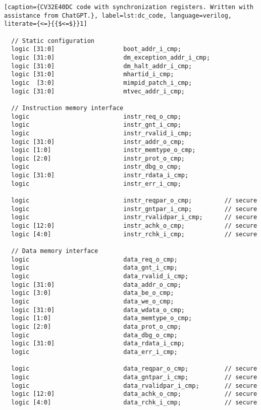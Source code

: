 \begin{lstlisting}[caption={CV32E40DC code with synchronization registers. Written with assistance from ChatGPT.}, label=lst:dc_code, language=verilog, literate={<=}{{$<=$}}1]                                                                                    

  // Static configuration
  logic [31:0]                   boot_addr_i_cmp;
  logic [31:0]                   dm_exception_addr_i_cmp;
  logic [31:0]                   dm_halt_addr_i_cmp;
  logic [31:0]                   mhartid_i_cmp;
  logic  [3:0]                   mimpid_patch_i_cmp;
  logic [31:0]                   mtvec_addr_i_cmp;

  // Instruction memory interface
  logic                          instr_req_o_cmp;
  logic                          instr_gnt_i_cmp;
  logic                          instr_rvalid_i_cmp;
  logic [31:0]                   instr_addr_o_cmp;
  logic [1:0]                    instr_memtype_o_cmp;
  logic [2:0]                    instr_prot_o_cmp;
  logic                          instr_dbg_o_cmp;
  logic [31:0]                   instr_rdata_i_cmp;
  logic                          instr_err_i_cmp;

  logic                          instr_reqpar_o_cmp;         // secure
  logic                          instr_gntpar_i_cmp;         // secure
  logic                          instr_rvalidpar_i_cmp;      // secure
  logic [12:0]                   instr_achk_o_cmp;           // secure
  logic [4:0]                    instr_rchk_i_cmp;           // secure

  // Data memory interface
  logic                          data_req_o_cmp;
  logic                          data_gnt_i_cmp;
  logic                          data_rvalid_i_cmp;
  logic [31:0]                   data_addr_o_cmp;
  logic [3:0]                    data_be_o_cmp;
  logic                          data_we_o_cmp;
  logic [31:0]                   data_wdata_o_cmp;
  logic [1:0]                    data_memtype_o_cmp;
  logic [2:0]                    data_prot_o_cmp;
  logic                          data_dbg_o_cmp;
  logic [31:0]                   data_rdata_i_cmp;
  logic                          data_err_i_cmp;

  logic                          data_reqpar_o_cmp;          // secure
  logic                          data_gntpar_i_cmp;          // secure
  logic                          data_rvalidpar_i_cmp;       // secure
  logic [12:0]                   data_achk_o_cmp;            // secure
  logic [4:0]                    data_rchk_i_cmp;            // secure


\end{lstlisting}
